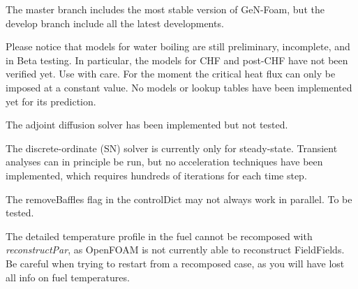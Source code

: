 
\begin{DoxyItemize}
\item The master branch includes the most stable version of Ge\+N-\/\+Foam, but the develop branch include all the latest developments.
\item Please notice that models for water boiling are still preliminary, incomplete, and in Beta testing. In particular, the models for C\+HF and post-\/\+C\+HF have not been verified yet. Use with care. For the moment the critical heat flux can only be imposed at a constant value. No models or lookup tables have been implemented yet for its prediction.
\item The adjoint diffusion solver has been implemented but not tested.
\item The discrete-\/ordinate (SN) solver is currently only for steady-\/state. Transient analyses can in principle be run, but no acceleration techniques have been implemented, which requires hundreds of iterations for each time step.
\item The remove\+Baffles flag in the control\+Dict may not always work in parallel. To be tested.
\item The detailed temperature profile in the fuel cannot be recomposed with {\itshape reconstruct\+Par}, as Open\+F\+O\+AM is not currently able to reconstruct Field\+Fields. Be careful when trying to restart from a recomposed case, as you will have lost all info on fuel temperatures. 
\end{DoxyItemize}
